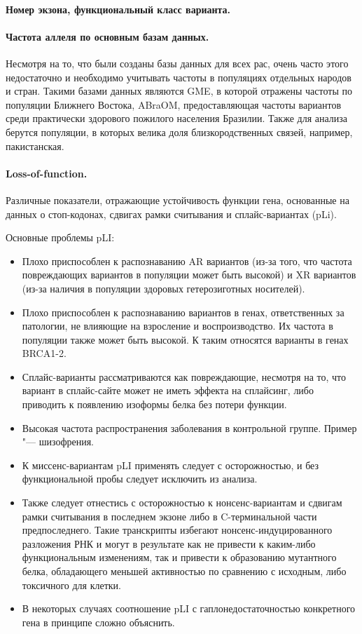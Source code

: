 \documentclass[a4paper,12pt]{article}
\begin{document}
\paragraph{Номер экзона, функциональный класс варианта.}

\paragraph{Частота аллеля по основным базам данных.}
Несмотря на то, что были созданы базы данных для всех рас, очень часто этого недостаточно и необходимо учитывать частоты в популяциях отдельных народов и стран.
Такими базами данных являются GME\cite{gme}, в которой отражены частоты по популяции Ближнего Востока, ABraOM\cite{abraom}, предоставляющая частоты вариантов среди практически здорового пожилого населения Бразилии.
Также для анализа берутся популяции, в которых велика доля близкородственных связей, например, пакистанская\cite{saleheen}.


\paragraph{Loss-of-function.}
Различные показатели, отражающие устойчивость функции гена, основанные на данных о стоп-кодонах, сдвигах рамки считывания и сплайс-вариантах (pLi).

Основные проблемы pLI\cite{ziegler}:

\begin{itemize}
\item Плохо приспособлен к распознаванию AR вариантов (из-за того, что частота повреждающих вариантов в популяции может быть высокой) и XR вариантов (из-за наличия в популяции здоровых гетерозиготных носителей).
\item Плохо приспособлен к распознаванию вариантов в генах, ответственных за патологии, не влияющие на взросление и воспроизводство.
Их частота в популяции также может быть высокой.
К таким относятся варианты в генах BRCA1-2.
\item Сплайс-варианты рассматриваются как повреждающие, несмотря на то, что вариант в сплайс-сайте может не иметь эффекта на сплайсинг, либо приводить к появлению изоформы белка без потери функции.
\item Высокая частота распространения заболевания в контрольной группе.
Пример "--- шизофрения.
\item К миссенс-вариантам pLI применять следует с осторожностью, и без функциональной пробы следует исключить из анализа.
\item Также следует отнестись с осторожностью к нонсенс-вариантам и сдвигам рамки считывания в последнем экзоне либо в C-терминальной части предпоследнего.
Такие транскрипты избегают нонсенс-индуцированного разложения РНК и могут в результате как не привести к каким-либо функциональным изменениям, так и привести к образованию мутантного белка, обладающего меньшей активностью по сравнению с исходным, либо токсичного для клетки.
\item В некоторых случаях соотношение pLI с гаплонедостаточностью конкретного гена в принципе сложно объяснить.
\end{itemize}
\end{document}
